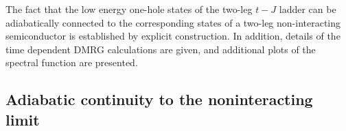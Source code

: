 \documentclass[aps,prb,twocolumn]{revtex4}
\begin{document}
The fact that the low energy one-hole states of  the two-leg $t-J$ ladder can
be adiabatically connected to the corresponding states of  a two-leg
non-interacting semiconductor is established by explicit construction.  In
addition, details of the time dependent DMRG calculations are given, and
additional plots of the spectral function are presented.  


\subsection{Adiabatic continuity to the noninteracting limit}
\end{document}
